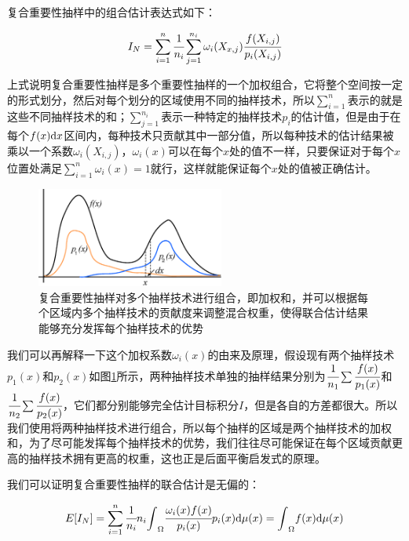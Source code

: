 复合重要性抽样中的组合估计表达式如下：

\begin{equation}\label{e:combined-estimator}
	I_N=\sum_{i=1}^{n} \cfrac{1}{n_i}\sum_{j=1}^{n_i}\omega_i(X_{x,j}) \cfrac{f(X_{i,j})}{p_i(X_{i,j})}
\end{equation}

上式说明复合重要性抽样是多个重要性抽样的一个加权组合，它将整个空间按一定的形式划分，然后对每个划分的区域使用不同的抽样技术，所以$\sum^{n}_{i=1}$表示的就是这些不同抽样技术的和；$\sum^{n_i}_{j=1}$表示一种特定的抽样技术$p_i$的估计值，但是由于在每个$f(x){\rm d}x$区间内，每种技术只贡献其中一部分值，所以每种技术的估计结果被乘以一个系数$\omega_i(X_{i,j})$，$\omega_i(x)$可以在每个$x$处的值不一样，只要保证对于每个$x$位置处满足$\sum^{n}_{i=1}\omega_i(x)=1$就行，这样就能保证每个$x$处的值被正确估计。

\begin{figure}
	\sidecaption
	\includegraphics[width=0.55\textwidth]{figures/mc/mis}
	\caption{复合重要性抽样对多个抽样技术进行组合，即加权和，并可以根据每个区域内多个抽样技术的贡献度来调整混合权重，使得联合估计结果能够充分发挥每个抽样技术的优势}
	\label{f:mc-mis-example}
\end{figure}

我们可以再解释一下这个加权系数$\omega_i(x)$的由来及原理，假设现有两个抽样技术$p_1(x)$和$p_2(x)$如图\ref{f:mc-mis-example}所示，两种抽样技术单独的抽样结果分别为$ \cfrac{1}{n_1}\sum \cfrac{f(x)}{p_1(x)}$和$ \cfrac{1}{n_2}\sum \cfrac{f(x)}{p_2(x)}$，它们都分别能够完全估计目标积分$I$，但是各自的方差都很大。所以我们使用将两种抽样技术进行组合，所以每个抽样的区域是两个抽样技术的加权和，为了尽可能发挥每个抽样技术的优势，我们往往尽可能保证在每个区域贡献更高的抽样技术拥有更高的权重，这也正是后面平衡启发式的原理。

我们可以证明复合重要性抽样的联合估计是无偏的：

\begin{equation}
	E[I_N]=\sum_{i=1}^{n} \cfrac{1}{n_i}n_i{\rm \int}_{\Omega} \cfrac{\omega_i(x)f(x)}{p_i(x)}p_i(x){\rm d}\mu (x)={\rm \int}_{\Omega}f(x){\rm d}\mu (x)
\end{equation}

